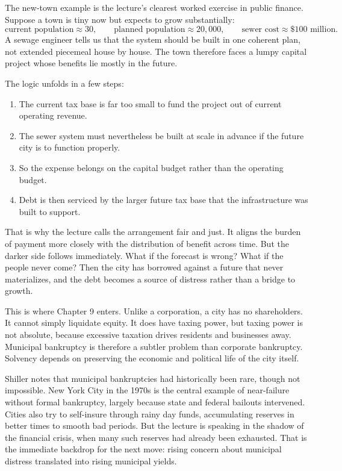 The new-town example is the lecture's clearest worked exercise in public finance. Suppose a town is tiny now but expects to grow substantially:
\begin{equation}
\text{current population} \approx 30,
\qquad
\text{planned population} \approx 20{,}000,
\qquad
\text{sewer cost} \approx \$100\text{ million}.
\end{equation}
A sewage engineer tells us that the system should be built in one coherent plan, not extended piecemeal house by house. The town therefore faces a lumpy capital project whose benefits lie mostly in the future.

The logic unfolds in a few steps:
\begin{enumerate}
\item The current tax base is far too small to fund the project out of current operating revenue.
\item The sewer system must nevertheless be built at scale in advance if the future city is to function properly.
\item So the expense belongs on the capital budget rather than the operating budget.
\item Debt is then serviced by the larger future tax base that the infrastructure was built to support.
\end{enumerate}

That is why the lecture calls the arrangement fair and just. It aligns the burden of payment more closely with the distribution of benefit across time. But the darker side follows immediately. What if the forecast is wrong? What if the people never come? Then the city has borrowed against a future that never materializes, and the debt becomes a source of distress rather than a bridge to growth.

This is where Chapter 9 enters. Unlike a corporation, a city has no shareholders. It cannot simply liquidate equity. It does have taxing power, but taxing power is not absolute, because excessive taxation drives residents and businesses away. Municipal bankruptcy is therefore a subtler problem than corporate bankruptcy. Solvency depends on preserving the economic and political life of the city itself.

Shiller notes that municipal bankruptcies had historically been rare, though not impossible. New York City in the 1970s is the central example of near-failure without formal bankruptcy, largely because state and federal bailouts intervened. Cities also try to self-insure through rainy day funds, accumulating reserves in better times to smooth bad periods. But the lecture is speaking in the shadow of the financial crisis, when many such reserves had already been exhausted. That is the immediate backdrop for the next move: rising concern about municipal distress translated into rising municipal yields.

